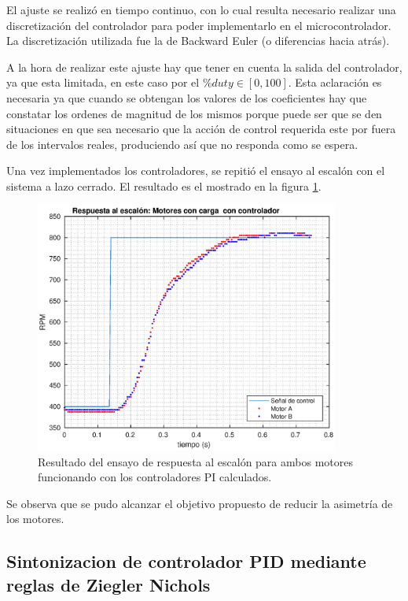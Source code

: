 \documentclass[10pt,conference,a4paper,onecolumn]{article}%
\begin{document}
El ajuste se realizó en tiempo continuo, con lo cual resulta necesario realizar una discretización del controlador para poder implementarlo en el microcontrolador. La discretización utilizada fue la de Backward Euler (o diferencias hacia atrás).

A la hora de realizar este ajuste hay que tener en cuenta la salida del controlador, ya que esta limitada, en este caso por el $\% duty \in [0, 100] $. Esta aclaración es necesaria ya que cuando se obtengan los valores de los coeficientes hay que constatar los ordenes de magnitud de los mismos porque puede ser que se den situaciones en que sea necesario que la acción de control requerida este por fuera de los intervalos reales, produciendo así que no responda como se espera.

Una vez implementados los controladores, se repitió el ensayo al escalón con el sistema a lazo cerrado. El resultado es el mostrado en la figura \ref{fig:respEscLazoCerrado}.
\begin{figure}[h]
\centering
\includegraphics[width=10cm]{./imagenes/resp_escalon_motores_controlados_2}
\caption{Resultado del ensayo de respuesta al escalón para ambos motores funcionando con los controladores PI calculados.}
\label{fig:respEscLazoCerrado}
\end{figure}
Se observa que se pudo alcanzar el objetivo propuesto de reducir la asimetría de los motores.

\subsection{Sintonizacion de controlador PID mediante reglas de Ziegler Nichols} %
\end{document}
